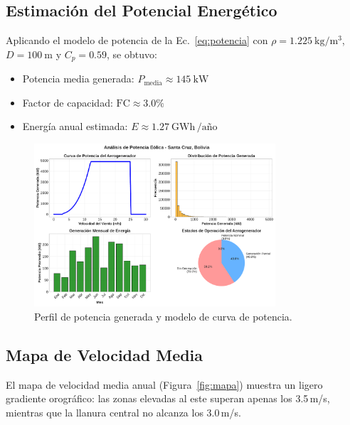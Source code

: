 \documentclass[a4paper,12pt]{article}
\begin{document}
	\subsection{Estimación del Potencial Energético}
	Aplicando el modelo de potencia de la Ec.~\eqref{eq:potencia} con $\rho=1.225\ \mathrm{kg/m^3}$, $D=100\ \mathrm{m}$ y $C_p=0.59$, se obtuvo:
	
	\begin{itemize}
		\item Potencia media generada: $P_\text{media}\approx145\ \mathrm{kW}$
		\item Factor de capacidad: $\mathrm{FC}\approx3.0\%$
		\item Energía anual estimada: $E \approx 1.27\ \mathrm{GWh}\,\text{/año}$
	\end{itemize}
	
	\begin{figure}[H]
		\centering
		\includegraphics[width=0.8\textwidth]{analisis_potencia.pdf}
		\caption{Perfil de potencia generada y modelo de curva de potencia.}
		\label{fig:potencia}
	\end{figure}
	
	\subsection{Mapa de Velocidad Media}
	El mapa de velocidad media anual (Figura~\ref{fig:mapa}) muestra un ligero gradiente orográfico: las zonas elevadas al este superan apenas los 3.5\,m/s, mientras que la llanura central no alcanza los 3.0\,m/s.
	
\end{document}
